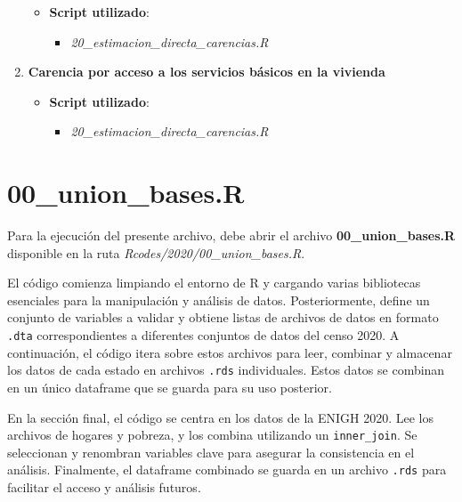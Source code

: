 \documentclass[
  12pt,
]{book}
\providecommand{\tightlist}{%
  \setlength{\itemsep}{0pt}\setlength{\parskip}{0pt}}
\begin{document}
\begin{enumerate}
  \begin{itemize}
  \tightlist
  \item
    \textbf{Script utilizado}:

    \begin{itemize}
    \tightlist
    \item
      \emph{20\_estimacion\_directa\_carencias.R}
    \end{itemize}
  \end{itemize}
\item
  \textbf{Carencia por acceso a los servicios básicos en la vivienda}

  \begin{itemize}
  \tightlist
  \item
    \textbf{Script utilizado}:

    \begin{itemize}
    \tightlist
    \item
      \emph{20\_estimacion\_directa\_carencias.R}
    \end{itemize}
  \end{itemize}
\end{enumerate}

\hypertarget{union_bases.r}{%
\chapter*{00\_union\_bases.R}\label{union_bases.r}}

Para la ejecución del presente archivo, debe abrir el archivo \textbf{00\_union\_bases.R} disponible en la ruta \emph{Rcodes/2020/00\_union\_bases.R}.

El código comienza limpiando el entorno de R y cargando varias bibliotecas esenciales para la manipulación y análisis de datos. Posteriormente, define un conjunto de variables a validar y obtiene listas de archivos de datos en formato \texttt{.dta} correspondientes a diferentes conjuntos de datos del censo 2020. A continuación, el código itera sobre estos archivos para leer, combinar y almacenar los datos de cada estado en archivos \texttt{.rds} individuales. Estos datos se combinan en un único dataframe que se guarda para su uso posterior.

En la sección final, el código se centra en los datos de la ENIGH 2020. Lee los archivos de hogares y pobreza, y los combina utilizando un \texttt{inner\_join}. Se seleccionan y renombran variables clave para asegurar la consistencia en el análisis. Finalmente, el dataframe combinado se guarda en un archivo \texttt{.rds} para facilitar el acceso y análisis futuros.
\end{document}
